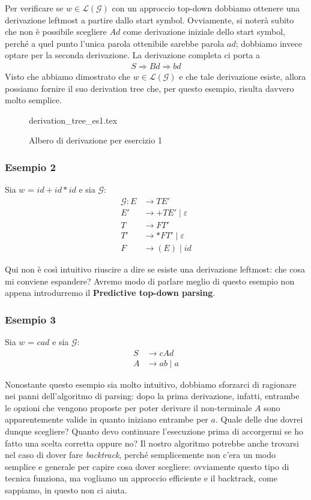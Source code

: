 \documentclass[class=book, crop=false, oneside, 12pt]{standalone}
\begin{document}
Per verificare se \(w \in \mathcal{L(G)}\) con un approccio top-down dobbiamo ottenere una derivazione leftmost a partire dallo start symbol. Ovviamente, si noterà subito che non è possibile scegliere \(Ad\) come derivazione iniziale dello start symbol, perché a quel punto l'unica parola ottenibile sarebbe parola \(ad\); dobbiamo invece optare per la seconda derivazione. La derivazione completa ci porta a
\begin{align*}
    S \Rightarrow Bd \Rightarrow bd
\end{align*}
Visto che abbiamo dimostrato che \(w \in \mathcal{L(G)}\) e che tale derivazione esiste, allora possiamo fornire il suo derivation tree che, per questo esempio, risulta davvero molto semplice.

\begin{figure}[H]
    \centering
    {derivation_tree_es1.tex}
    \caption{Albero di derivazione per esercizio 1}
    \label{par-td-es1}
\end{figure}

\subsubsection{Esempio 2}
Sia \(w\) = \(id + id * id\) e sia \(\mathcal{G}\):
\begin{align*}
    \mathcal{G}: E &\rightarrow TE' \\
    E' &\rightarrow +TE' \mid \varepsilon \\
    T &\rightarrow FT' \\
    T' &\rightarrow *FT' \mid \varepsilon \\
    F &\rightarrow (E) \mid id
\end{align*}

Qui non è così intuitivo riuscire a dire se esiste una derivazione leftmost: che cosa mi conviene espandere? Avremo modo di parlare meglio di questo esempio non appena introdurremo il \textbf{Predictive top-down parsing}.

\subsubsection{Esempio 3}
Sia \(w\) = \(cad\) e sia \(\mathcal{G}\):
\begin{align*}
    S &\rightarrow cAd \\
    A &\rightarrow ab \mid a
\end{align*}

Nonostante questo esempio sia molto intuitivo, dobbiamo sforzarci di ragionare nei panni dell'algoritmo di parsing: dopo la prima derivazione, infatti, entrambe le opzioni che vengono proposte per poter derivare il non-terminale \(A\) sono apparentemente valide in quanto iniziano entrambe per \(a\). Quale delle due dovrei dunque scegliere? Quanto devo continuare l'esecuzione prima di accorgermi se ho fatto una scelta corretta oppure no? Il nostro algoritmo potrebbe anche trovarsi nel caso di dover fare \emph{backtrack}, perché semplicemente non c'era un modo semplice e generale per capire cosa dover scegliere: ovviamente questo tipo di tecnica funziona, ma vogliamo un approccio efficiente e il backtrack, come sappiamo, in questo non ci aiuta.
\end{document}
